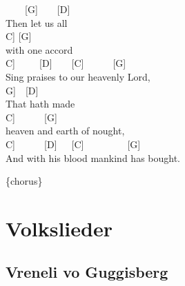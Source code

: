 \documentclass[
  letterpaper,
  twoside=false]{scrbook}
\begin{document}
~~~~{[}G{]}~~~~{[}D{]}\\
Then let us all\\
\hspace*{0.333em}\hspace*{0.333em}\hspace*{0.333em}\hspace*{0.333em}{[}C{]}
{[}G{]}\\
with one accord~~\\
\hspace*{0.333em}\hspace*{0.333em}\hspace*{0.333em}\hspace*{0.333em}{[}C{]}~~~~~{[}D{]}~~~~{[}C{]}~~~~~~{[}G{]}\\
Sing praises to our heavenly Lord,\\
\hspace*{0.333em}\hspace*{0.333em}\hspace*{0.333em}\hspace*{0.333em}{[}G{]}~~{[}D{]}\\
That hath made\\
\hspace*{0.333em}\hspace*{0.333em}\hspace*{0.333em}\hspace*{0.333em}\hspace*{0.333em}\hspace*{0.333em}\hspace*{0.333em}\hspace*{0.333em}\hspace*{0.333em}\hspace*{0.333em}{[}C{]}~~~~~~{[}G{]}\\
heaven and earth of nought,\\
\hspace*{0.333em}\hspace*{0.333em}\hspace*{0.333em}{[}C{]}~~~~~~{[}D{]}~~~{[}C{]}~~~~~~~~~{[}G{]}\\
And with his blood mankind has bought.

\{chorus\}

\part{Volkslieder}

\hypertarget{vreneli-vo-guggisberg}{%
\chapter{Vreneli vo Guggisberg}\label{vreneli-vo-guggisberg}}
\end{document}
